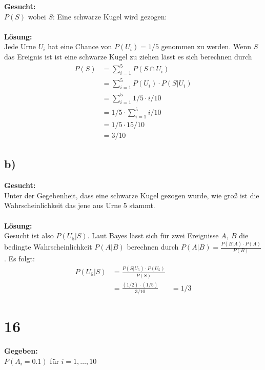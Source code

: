 \documentclass{article}
\begin{document}
\textbf{Gesucht:} \\

$P(S)$ wobei $S$: Eine schwarze Kugel wird gezogen:\\ \\
\textbf{Lösung:} \\

Jede Urne $U_{i}$ hat eine Chance von $P(U_{i})=1/5$ genommen zu werden. Wenn $S$ das Ereignis ist ist eine schwarze Kugel zu ziehen lässt es sich berechnen durch 
\begin{align*}
    P(S) &= \sum_{i = 1}^{5} P(S \cap U_{i}) \\
    &= \sum_{i =1}^{5} P(U_{i}) \cdot P(S|U_{i}) \\
    &= \sum_{i = 1}^{5} 1/5 \cdot i/10 \\
    &= 1/5 \cdot \sum_{i = 1}^{5} i/10 \\ 
    &= 1/5 \cdot 15/10 \\
    &= 3/10
\end{align*}  

\subsection*{b)}

\textbf{Gesucht:}\\

Unter der Gegebenheit, dass eine schwarze Kugel gezogen wurde, wie groß ist die Wahrscheinlichkeit das jene aus Urne 5 stammt.\\ \\

\textbf{Lösung:}\\ 

Gesucht ist also $P(U_{5}|S)$. Laut Bayes lässt sich für zwei Ereignisse $A,~B$ die bedingte Wahrscheinlichkeit $P(A|B)$ berechnen durch $P(A|B) = \frac{P(B|A)\cdot P(A)}{P(B)}$. Es folgt:
\begin{align*}
    P(U_{5}|S) &= \frac{P(S|U_{5})\cdot P(U_{5})}{P(S)}& \\
    &= \frac{(1/2) \cdot (1/5)}{3/10}&= 1/3
\end{align*}


\section*{16}

\textbf{Gegeben:} \\

$P(A_{i} = 0.1)$ für $i = 1, \ldots, 10$ \\ \\
\end{document}
